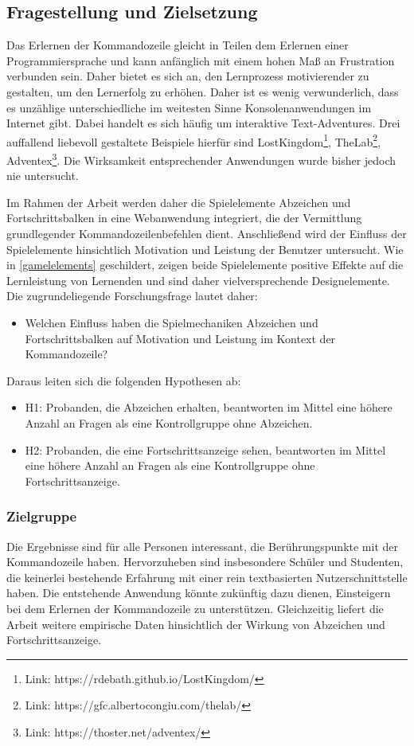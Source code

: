 \subsection{Fragestellung und Zielsetzung}
Das Erlernen der Kommandozeile gleicht in Teilen dem Erlernen einer Programmiersprache und kann anfänglich mit einem hohen Maß an Frustration verbunden sein. Daher bietet es sich an, den Lernprozess motivierender zu gestalten, um den Lernerfolg zu erhöhen. Daher ist es wenig verwunderlich, dass es unzählige unterschiedliche im weitesten Sinne  Konsolenanwendungen im Internet gibt. Dabei handelt es sich häufig um interaktive Text-Adventures. Drei auffallend liebevoll gestaltete Beispiele hierfür sind LostKingdom\footnote{Link: https://rdebath.github.io/LostKingdom/}, TheLab\footnote{Link: https://gfc.albertocongiu.com/thelab/}, Adventex\footnote{Link: https://thoster.net/adventex/}. Die Wirksamkeit entsprechender Anwendungen wurde bisher jedoch nie untersucht. 

Im Rahmen der Arbeit werden daher die Spielelemente Abzeichen und Fortschrittsbalken in eine Webanwendung integriert, die der Vermittlung grundlegender Kommandozeilenbefehlen dient. Anschließend wird der Einfluss der Spielelemente hinsichtlich Motivation und Leistung der Benutzer untersucht. Wie in \ref{gamelelements} geschildert, zeigen beide Spielelemente positive Effekte auf die Lernleistung von Lernenden und sind daher vielversprechende Designelemente. Die zugrundeliegende Forschungsfrage lautet daher:

\begin{itemize}
    \item Welchen Einfluss haben die Spielmechaniken Abzeichen und Fortschrittsbalken auf Motivation und Leistung im Kontext der Kommandozeile?
\end{itemize}

Daraus leiten sich die folgenden Hypothesen ab:

\begin{itemize}
\item H1: Probanden, die Abzeichen erhalten, beantworten im Mittel eine höhere Anzahl an Fragen als eine Kontrollgruppe ohne Abzeichen.
\item H2: Probanden, die eine Fortschrittsanzeige sehen, beantworten im Mittel eine höhere Anzahl an Fragen als eine Kontrollgruppe ohne Fortschrittsanzeige.
\end{itemize}

\subsubsection{Zielgruppe}
Die Ergebnisse sind für alle Personen interessant, die Berührungspunkte mit der Kommandozeile haben.
Hervorzuheben sind insbesondere Schüler und Studenten, die keinerlei bestehende Erfahrung mit einer rein textbasierten Nutzerschnittstelle haben.
Die entstehende Anwendung könnte zukünftig dazu dienen, Einsteigern bei dem Erlernen der Kommandozeile zu unterstützen.
Gleichzeitig liefert die Arbeit weitere empirische Daten hinsichtlich der Wirkung von Abzeichen und Fortschrittsanzeige.